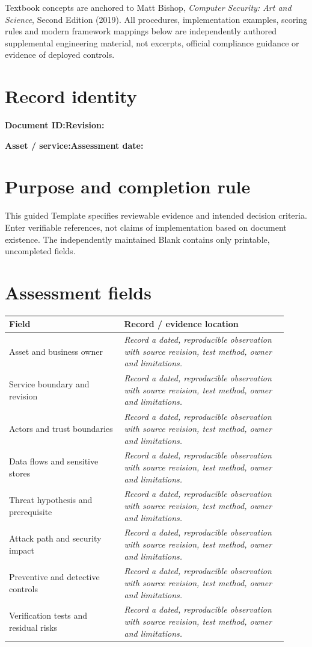 \documentclass[10pt,letterpaper]{article}
\begin{document}
\makedoctocpage
\begin{notebox}
Textbook concepts are anchored to Matt Bishop, \emph{Computer Security: Art and Science}, Second Edition (2019). All procedures, implementation examples, scoring rules and modern framework mappings below are independently authored supplemental engineering material, not excerpts, official compliance guidance or evidence of deployed controls.
\end{notebox}
\section{Record identity}
\textbf{Document ID:}\enspace\hrulefill\quad\textbf{Revision:}\enspace\hrulefill
\par\medskip\textbf{Asset / service:}\enspace\hrulefill\quad\textbf{Assessment date:}\enspace\hrulefill
\section{Purpose and completion rule}
This guided Template specifies reviewable evidence and intended decision criteria. Enter verifiable references, not claims of implementation based on document existence. The independently maintained Blank contains only printable, uncompleted fields.
\section{Assessment fields}
\renewcommand{\arraystretch}{1.8}
\begin{longtable}{@{}p{0.38\linewidth}p{0.54\linewidth}@{}}
\toprule\textbf{Field}&\textbf{Record / evidence location}\\\midrule\endhead
Asset and business owner & \emph{Record a dated, reproducible observation with source revision, test method, owner and limitations.}\\\midrule
Service boundary and revision & \emph{Record a dated, reproducible observation with source revision, test method, owner and limitations.}\\\midrule
Actors and trust boundaries & \emph{Record a dated, reproducible observation with source revision, test method, owner and limitations.}\\\midrule
Data flows and sensitive stores & \emph{Record a dated, reproducible observation with source revision, test method, owner and limitations.}\\\midrule
Threat hypothesis and prerequisite & \emph{Record a dated, reproducible observation with source revision, test method, owner and limitations.}\\\midrule
Attack path and security impact & \emph{Record a dated, reproducible observation with source revision, test method, owner and limitations.}\\\midrule
Preventive and detective controls & \emph{Record a dated, reproducible observation with source revision, test method, owner and limitations.}\\\midrule
Verification tests and residual risks & \emph{Record a dated, reproducible observation with source revision, test method, owner and limitations.}\\\midrule
\bottomrule\end{longtable}
\end{document}
